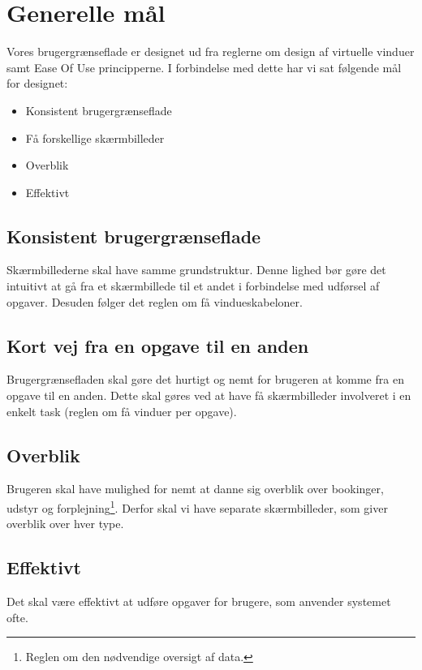 \clearpage
\section{Generelle mål}
\label{Design_G_Goals}
Vores brugergrænseflade er designet ud fra reglerne om design af virtuelle vinduer\cite[s. 169]{SL_UID} samt Ease Of Use principperne\cite[s. 9]{SL_UID}. I forbindelse med dette har vi sat følgende mål for designet:
\begin{itemize}
\item Konsistent brugergrænseflade
\item Få forskellige skærmbilleder
\item Overblik
\item Effektivt
\end{itemize}

\subsection{Konsistent brugergrænseflade}
Skærmbillederne skal have samme grundstruktur. Denne lighed bør gøre det intuitivt at gå fra et skærmbillede til et andet i forbindelse med udførsel af opgaver. Desuden følger det reglen om få vindueskabeloner.

\subsection{Kort vej fra en opgave til en anden}
Brugergrænsefladen skal gøre det hurtigt og nemt for brugeren at komme fra en opgave til en anden. Dette skal gøres ved at have få skærmbilleder involveret i en enkelt task (reglen om få vinduer per opgave).

\subsection{Overblik}
Brugeren skal have mulighed for nemt at danne sig overblik over bookinger, udstyr og forplejning\footnote{Reglen om den nødvendige oversigt af data.}. Derfor skal vi have separate skærmbilleder, som giver overblik over hver type.

\subsection{Effektivt}
Det skal være effektivt at udføre opgaver for brugere, som anvender systemet ofte.

\clearpage
